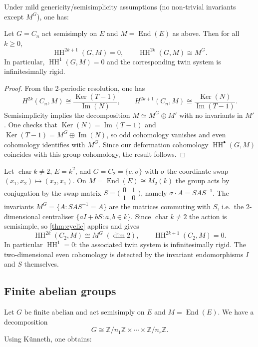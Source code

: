 \documentclass[11pt,a4paper]{article}
\numberwithin{equation}{section}
\newcommand{\Z}{\mathbb{Z}}
\DeclareMathOperator{\End}{End}
\DeclareMathOperator{\Ker}{Ker}
\DeclareMathOperator{\Img}{Im}
\DeclareMathOperator{\HH}{HH}
\begin{document}
	Under mild genericity/semisimplicity assumptions (no non-trivial invariants except $M^G$), one has:
	
	\begin{theorem}\label{thm:cyclic}
		Let $G=C_n$ act semisimply on $E$ and $M=\End(E)$ as above.
		Then for all $k\ge 0$,
		\[
		\HH^{2k+1}(G,M) = 0, \qquad
		\HH^{2k}(G,M) \cong M^G.
		\]
		In particular, $\HH^1(G,M)=0$ and the corresponding twin system is infinitesimally rigid.
	\end{theorem}
	
	\begin{proof}
		From the 2-periodic resolution, one has
		\[
		H^{2k}(C_n,M) \cong \frac{\Ker(T-1)}{\Img(N)},\qquad
		H^{2k+1}(C_n,M) \cong \frac{\Ker(N)}{\Img(T-1)}.
		\]
		Semisimplicity implies the decomposition $M\simeq M^G\oplus M'$ with no invariants in $M'$.
		One checks that $\Ker(N)=\Img(T-1)$ and $\Ker(T-1)=M^G\oplus\Img(N)$,
		so odd cohomology vanishes and even cohomology identifies with $M^G$.
		Since our deformation cohomology $\HH^\bullet(G,M)$ coincides with this group cohomology,
		the result follows.
	\end{proof}
	
	\begin{example}\label{ex:C2-swap}
		Let $\operatorname{char}k\neq 2$, $E=k^2$, and $G=C_2=\{e,\sigma\}$ with $\sigma$ the coordinate
		swap $(x_1,x_2)\mapsto(x_2,x_1)$. On $M=\End(E)\cong M_2(k)$ the group acts by conjugation by the
		swap matrix $S=\bigl(\begin{smallmatrix}0&1\\1&0\end{smallmatrix}\bigr)$, namely $\sigma\cdot A=SAS^{-1}$.
		The invariants $M^G=\{A:SAS^{-1}=A\}$ are the matrices commuting with $S$, i.e.\ the $2$-dimensional
		centraliser $\{aI+bS:a,b\in k\}$. Since $\operatorname{char}k\neq 2$ the action is semisimple, so
		\cref{thm:cyclic} applies and gives
		\[
			\HH^{2k}(C_2,M)\cong M^G\;(\dim 2),\qquad \HH^{2k+1}(C_2,M)=0.
		\]
		In particular $\HH^1=0$: the associated twin system is infinitesimally rigid. The two-dimensional
		even cohomology is detected by the invariant endomorphisms $I$ and $S$ themselves.
	\end{example}

	\subsection{Finite abelian groups}
	
	Let $G$ be finite abelian and act semisimply on $E$ and $M=\End(E)$.
	We have a decomposition
	\[
	G \cong \Z/n_1\Z \times \cdots \times \Z/n_r\Z.
	\]
	Using Künneth, one obtains:
	
\end{document}
